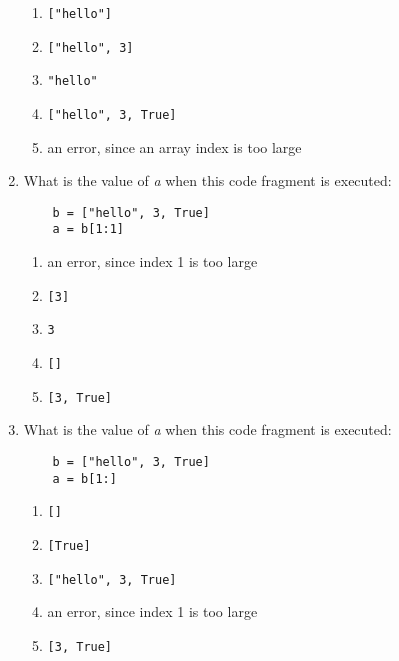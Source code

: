 \documentclass[10pt]{article}
\begin{document}
\begin{enumerate}
\begin{enumerate}
\item
{\codesize\verb!["hello"]!}
\item
{\codesize\verb!["hello", 3]!}
\item
{\codesize\verb!"hello"!}
\item
{\codesize\verb!["hello", 3, True]!}
\item
an error, since an array index is too large
\end{enumerate}
\item
What is the value of {\it a} when this code fragment is executed: 
\color{CodeGreen}
\begin{codesize}
\begin{verbatim}
    b = ["hello", 3, True]
    a = b[1:1]
\end{verbatim}
\end{codesize}
\color{black}

\begin{enumerate}
\item
an error, since index 1 is too large
\item
{\codesize\verb![3]!}
\item
{\codesize\verb!3!}
\item
{\codesize\verb![]!}
\item
{\codesize\verb![3, True]!}
\end{enumerate}
\item
What is the value of {\it a} when this code fragment is executed: 
\color{CodeGreen}
\begin{codesize}
\begin{verbatim}
    b = ["hello", 3, True]
    a = b[1:]
\end{verbatim}
\end{codesize}
\color{black}

\begin{enumerate}
\item
{\codesize\verb![]!}
\item
{\codesize\verb![True]!}
\item
{\codesize\verb!["hello", 3, True]!}
\item
an error, since index 1 is too large
\item
{\codesize\verb![3, True]!}
\end{enumerate}

\end{enumerate}
\end{document}
